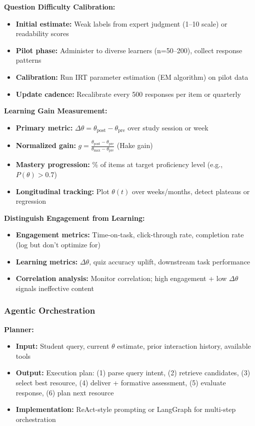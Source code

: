 \documentclass[11pt,letterpaper]{article}
\begin{document}
\textbf{Question Difficulty Calibration:}
\begin{itemize}
\item \textbf{Initial estimate:} Weak labels from expert judgment (1--10 scale) or readability scores
\item \textbf{Pilot phase:} Administer to diverse learners (n=50--200), collect response patterns
\item \textbf{Calibration:} Run IRT parameter estimation (EM algorithm) on pilot data
\item \textbf{Update cadence:} Recalibrate every 500 responses per item or quarterly
\end{itemize}

\textbf{Learning Gain Measurement:}
\begin{itemize}
\item \textbf{Primary metric:} $\Delta\theta = \theta_{\text{post}} - \theta_{\text{pre}}$ over study session or week
\item \textbf{Normalized gain:} $g = \frac{\theta_{\text{post}} - \theta_{\text{pre}}}{\theta_{\text{max}} - \theta_{\text{pre}}}$ (Hake gain)
\item \textbf{Mastery progression:} \% of items at target proficiency level (e.g., $P(\theta) > 0.7$)
\item \textbf{Longitudinal tracking:} Plot $\theta(t)$ over weeks/months, detect plateaus or regression
\end{itemize}

\textbf{Distinguish Engagement from Learning:}
\begin{itemize}
\item \textbf{Engagement metrics:} Time-on-task, click-through rate, completion rate (log but don't optimize for)
\item \textbf{Learning metrics:} $\Delta\theta$, quiz accuracy uplift, downstream task performance
\item \textbf{Correlation analysis:} Monitor correlation; high engagement + low $\Delta\theta$ signals ineffective content
\end{itemize}

\subsubsection{Agentic Orchestration}

\textbf{Planner:}
\begin{itemize}
\item \textbf{Input:} Student query, current $\theta$ estimate, prior interaction history, available tools
\item \textbf{Output:} Execution plan: (1) parse query intent, (2) retrieve candidates, (3) select best resource, (4) deliver + formative assessment, (5) evaluate response, (6) plan next resource
\item \textbf{Implementation:} ReAct-style prompting or LangGraph for multi-step orchestration
\end{itemize}
\end{document}
